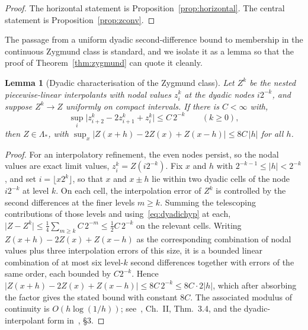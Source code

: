 \documentclass{article}
\theoremstyle{plain}
\newtheorem{lemma}[theorem]{Lemma}
\theoremstyle{definition}
\newcommand{\abs}[1]{\lvert #1 \rvert}
\begin{document}
\begin{proof}
The horizontal statement is Proposition~\ref{prop:horizontal}. The central
statement is Proposition~\ref{prop:zconv}.
\end{proof}

The passage from a uniform dyadic second-difference bound to membership in the
continuous Zygmund class is standard, and we isolate it as a lemma so that the
proof of Theorem~\ref{thm:zygmund} can quote it cleanly.

\begin{lemma}[Dyadic characterisation of the Zygmund class]\label{lem:dyadiczyg}
Let $Z^k$ be the nested piecewise-linear interpolants with nodal values $z_i^k$
at the dyadic nodes $i2^{-k}$, and suppose $Z^k\to Z$ uniformly on compact
intervals. If there is $C<\infty$ with,
\begin{equation}\label{eq:dyadichyp}
  \sup_i\abs{z_{i+2}^k-2z_{i+1}^k+z_i^k}\leq C\,2^{-k}\qquad(k\ge0),
\end{equation}
then $Z\in\Lambda_*$, with
$\sup_x\abs{Z(x+h)-2Z(x)+Z(x-h)}\le 8C\,\abs h$ for all $h$.
\end{lemma}

\begin{proof}
For an interpolatory refinement, the even nodes persist, so the nodal values are
exact limit values, $z_i^k=Z(i2^{-k})$. Fix $x$ and $h$ with
$2^{-k-1}\le\abs h<2^{-k}$, and set $i=\lfloor x2^k\rfloor$, so that $x$ and
$x\pm h$ lie within two dyadic cells of the node $i2^{-k}$ at level $k$. On each
cell, the interpolation error of $Z^k$ is controlled by the second differences at
the finer levels $m\ge k$. Summing the telescoping contributions of those levels
and using~\eqref{eq:dyadichyp} at each, $\abs{Z-Z^k}\le \tfrac14\sum_{m\ge
k}C\,2^{-m}\le \tfrac12 C\,2^{-k}$ on the relevant cells. Writing
$Z(x+h)-2Z(x)+Z(x-h)$ as the corresponding combination of nodal values plus
three interpolation errors of this size, it is a bounded linear combination of at
most six level-$k$ second differences together with errors of the same order,
each bounded by $C2^{-k}$. Hence
$\abs{Z(x+h)-2Z(x)+Z(x-h)}\le 8C\,2^{-k}\le 8C\cdot 2\abs h$, which after
absorbing the factor gives the stated bound with constant $8C$. The associated
modulus of continuity is $O(h\log(1/h))$; see~\cite{Zygmund}, Ch.~II, Thm.~3.4,
and the dyadic-interpolant form in~\cite{DynLevin02}, \S3.
\end{proof}
\end{document}
